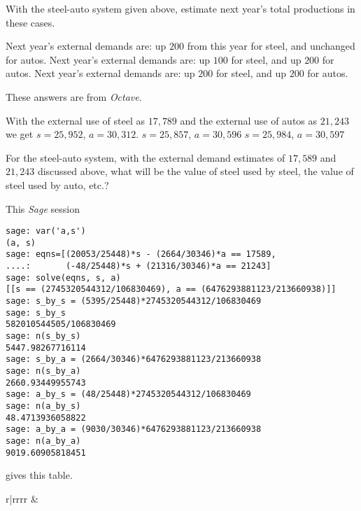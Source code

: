 \begin{exercises}
  \item 
    With the steel-auto system given above, estimate next year's
    total productions in these cases.
    \begin{exparts}
      \partsitem Next year's external demands are: up $200$ from this
         year for steel, and unchanged for autos.
      \partsitem Next year's external demands are: up $100$ for steel, and
         up $200$ for autos.
      \partsitem Next year's external demands are: up $200$ for steel, and
         up $200$ for autos.
    \end{exparts} 
    \begin{answer}
      These answers are from \textit{Octave}.
      \begin{exparts}
        \partsitem With the external use of steel as $17,789$ and the 
          external use of autos as $21,243$ we get $s=25,952$, $a=30,312$.
        \partsitem $s=25,857$, $a=30,596$
        \partsitem $s=25,984$, $a=30,597$
      \end{exparts}
    \end{answer}
  \item 
    For the steel-auto system,  
    with the external demand estimates of $17,589$ and $21,243$
    discussed above, what will be the value of steel used by steel,
    the value of steel used by auto, etc.? 
    \begin{answer}
      This \textit{Sage} session
\begin{lstlisting}
sage: var('a,s')
(a, s)
sage: eqns=[(20053/25448)*s - (2664/30346)*a == 17589,
....:       (-48/25448)*s + (21316/30346)*a == 21243] 
sage: solve(eqns, s, a)
[[s == (2745320544312/106830469), a == (6476293881123/213660938)]]
sage: s_by_s = (5395/25448)*2745320544312/106830469
sage: s_by_s
582010544505/106830469
sage: n(s_by_s)
5447.98267716114
sage: s_by_a = (2664/30346)*6476293881123/213660938  
sage: n(s_by_a)
2660.93449955743
sage: a_by_s = (48/25448)*2745320544312/106830469
sage: n(a_by_s)
48.4713936058822
sage: a_by_a = (9030/30346)*6476293881123/213660938
sage: n(a_by_a)
9019.60905818451        
\end{lstlisting}
      gives this table.
      \begin{center}
        \begin{tabular}{r|rrrr}
         &
\end{tabular}
\end{center}
\end{answer}
\end{exercises}
